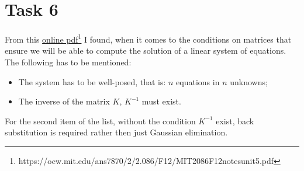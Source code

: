 \documentclass{article}
\begin{document}
\section*{Task 6}
From this \href{https://ocw.mit.edu/ans7870/2/2.086/F12/MIT2_086F12_notes_unit5.pdf}{online pdf}\footnote{https://ocw.mit.edu/ans7870/2/2.086/F12/MIT2086F12notesunit5.pdf} I found, when it comes to the conditions on matrices that ensure we will be able to compute the solution of a linear system of equations. The following has to be mentioned:
\begin{itemize}
\item The system has to be well-posed, that is: $n$ equations in $n$ unknowns;
\item The inverse of the matrix $K$, $K^{-1}$ must exist.
\end{itemize}
For the second item of the list, without the condition $K^{-1}$ exist, back substitution is required rather then just Gaussian elimination.
\end{document}
